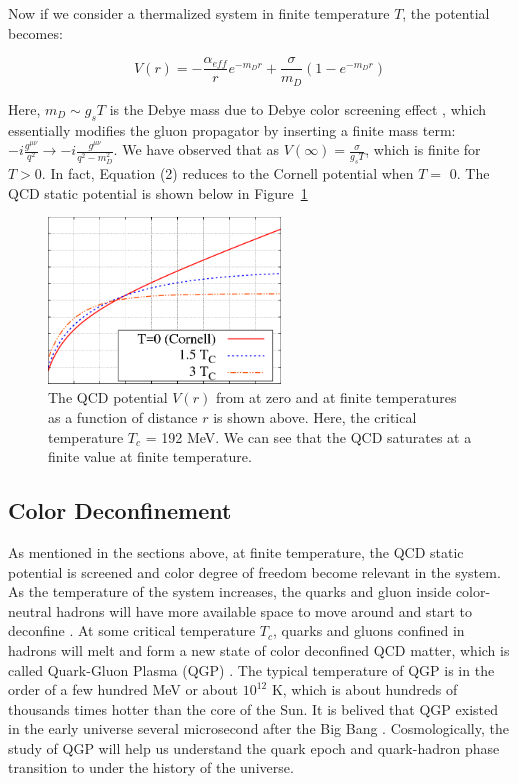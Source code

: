 Now if we consider a thermalized system in finite temperature $T$, the potential becomes: 

\begin{equation}
V(r) = -\frac{\alpha_{eff}}{r} e^{-m_D r} + \frac{\sigma}{m_D} (1 - e^{-m_D r})
\end{equation}

Here, $m_D \sim g_s T$ is the Debye mass due to Debye color screening effect \cite{CSEff}, which essentially modifies the gluon propagator by inserting a finite mass term: $-i \frac{g^{\mu\nu}}{q^2} \rightarrow -i \frac{g^{\mu\nu}}{q^2 - m_D^2}$. We have observed that as $V(\infty) = \frac{\sigma}{g_sT}$, which is finite for $T>$0. In fact, Equation (2) reduces to the Cornell potential when $T =$ 0. The QCD static potential is shown below in Figure~\ref{QCDPotential} \cite{TDepCornell}


\begin{figure}[hbtp]
\begin{center}
\includegraphics[width=0.55\textwidth]{Figures/Chapter1/QCDPotential.png}
\caption{The QCD potential $V(r)$ from at zero and at finite temperatures as a function of distance $r$ is shown above. Here, the critical temperature $T_c $ = 192 MeV. We can see that the QCD saturates at a finite value at finite temperature. }
\label{QCDPotential}
\end{center}
\end{figure} 


\subsection{Color Deconfinement}

As mentioned in the sections above, at finite temperature, the QCD static potential is screened and color degree of freedom become relevant in the system. As the temperature of the system increases, the quarks and gluon inside color-neutral hadrons will have more available space to move around and start to deconfine \cite{DeconfineTemp}. At some critical temperature $T_c$, quarks and gluons confined in hadrons will melt and form a new state of color deconfined QCD matter, which is called Quark-Gluon Plasma (QGP) \cite{QGPDeconfine}. The typical temperature of QGP is in the order of a few hundred MeV or about $10^{12}$ K, which is about hundreds of thousands times hotter than the core of the Sun. It is belived that QGP existed in the early universe several microsecond after the Big Bang \cite{}. Cosmologically, the study of QGP will help us understand the quark epoch and quark-hadron phase transition to under the history of the universe. 

